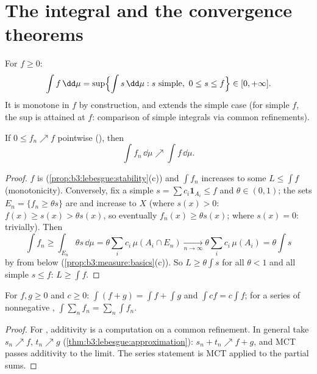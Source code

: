 \section{The integral and the convergence theorems}

\begin{definition}\label{def:b3:lebesgue:integral}
For  $f \geq 0$:
\[
\int f \,\dd\mu = \sup\Bigl\{\int s\,\dd\mu : s \text{ simple},
\ 0 \leq s \leq f\Bigr\} \in [0, +\infty].
\]
It is monotone in $f$ by construction, and extends the simple
case (for simple $f$, the sup is attained at $f$: comparison of
simple integrals via common refinements).
\end{definition}

\begin{theorem}
\label{thm:b3:lebesgue:mct}
If $0 \leq f_n \nearrow f$ pointwise (), then
\[
\int f_n\,\dd\mu \nearrow \int f\,\dd\mu .
\]
\end{theorem}

\begin{proof}
$f$ is  (\cref{prop:b3:lebesgue:stability}(c)) and
$\int f_n$ increases to some $L \leq \int f$ (monotonicity).
Conversely, fix a simple $s = \sum c_i\mathbf 1_{A_i} \leq f$
and $\theta \in (0,1)$; the sets $E_n = \{f_n \geq \theta s\}$
are  and increase to $X$ (where $s(x) > 0$: $f(x)
\geq s(x) > \theta s(x)$, so eventually $f_n(x) \geq \theta
s(x)$; where $s(x) = 0$: trivially). Then
\[
\int f_n \geq \int_{E_n}\theta s\,\dd\mu
= \theta\sum_i c_i\,\mu(A_i \cap E_n)
\xrightarrow[n\to\infty]{} \theta\sum_ic_i\,\mu(A_i)
= \theta\int s
\]
by  from below (\cref{prop:b3:measure:basics}(c)).
So $L \geq \theta\int s$ for all $\theta < 1$ and all simple $s
\leq f$: $L \geq \int f$.
\end{proof}

\begin{corollary}\label{cor:b3:lebesgue:additivity}
For  $f, g \geq 0$ and $c \geq 0$: $\int(f + g) =
\int f + \int g$ and $\int cf = c\int f$; for a series of
nonnegative , $\int\sum_nf_n =
\sum_n\int f_n$.
\end{corollary}

\begin{proof}
For , additivity is a computation on a common
refinement. In general take $s_n \nearrow f$, $t_n \nearrow g$
(\cref{thm:b3:lebesgue:approximation}): $s_n + t_n \nearrow f +
g$, and MCT passes additivity to the limit. The series
statement is MCT applied to the partial sums.
\end{proof}

